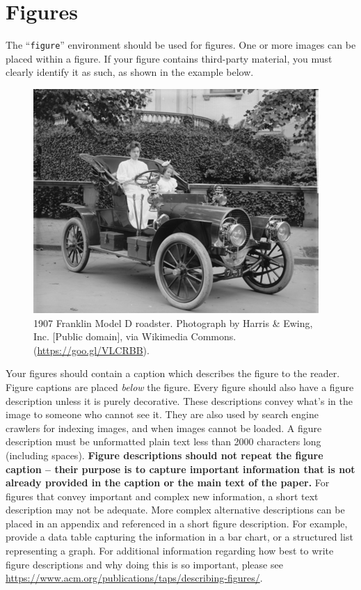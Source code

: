 \documentclass[sigplan,screen]{acmart}
\begin{document}
\section{Figures}
The ``\verb|figure|'' environment should be used for figures. One or
more images can be placed within a figure. If your figure contains
third-party material, you must clearly identify it as such, as shown
in the example below.
\begin{figure}[h]
	\centering
	\includegraphics[width=\linewidth]{sample-franklin}
	\caption{1907 Franklin Model D roadster. Photograph by Harris \&
		Ewing, Inc. [Public domain], via Wikimedia
		Commons. (\url{https://goo.gl/VLCRBB}).}
\end{figure}
Your figures should contain a caption which describes the figure to
the reader.
Figure captions are placed {\itshape below} the figure.
Every figure should also have a figure description unless it is purely
decorative. These descriptions convey what’s in the image to someone
who cannot see it. They are also used by search engine crawlers for
indexing images, and when images cannot be loaded.
A figure description must be unformatted plain text less than 2000
characters long (including spaces).  {\bfseries Figure descriptions
		should not repeat the figure caption – their purpose is to capture
		important information that is not already provided in the caption or
		the main text of the paper.} For figures that convey important and
complex new information, a short text description may not be
adequate. More complex alternative descriptions can be placed in an
appendix and referenced in a short figure description. For example,
provide a data table capturing the information in a bar chart, or a
structured list representing a graph.  For additional information
regarding how best to write figure descriptions and why doing this is
so important, please see
\url{https://www.acm.org/publications/taps/describing-figures/}.
\end{document}
